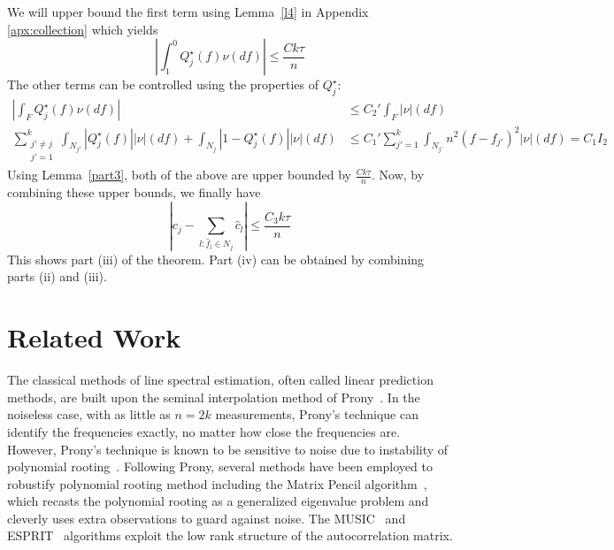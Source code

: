 We will upper bound the first term using Lemma~\ref{l4} in Appendix \ref{apx:collection} which yields
\[
\left| \int^0_{1}  Q_j^\star (f) \nu(df)\right| \leq \frac{Ck \tau}{n}
\]
The other terms can be controlled using the properties of $Q_j^\star$:
\begin{align*}
\left| \int_{F}  Q_j^\star (f) \nu(df)\right| & \leq C_2' \int_{F} |\nu| (df)\\
\sum_{\substack{j' \neq j\\j'=1}}^k \int_{N_{j'}} \left| Q_j^\star (f)\right| |\nu|(df) +  \int_{N_j}  \left|1-Q_j^\star (f)\right| |\nu|(df)
& \leq
 C_1'\sum_{j'=1}^k \int_{N_{j'}} n^2 (f-f_{j'})^2 |\nu|(df) = C_1 I_2
\end{align*}
Using Lemma~\ref{part3}, both of the above are upper bounded by $\frac{C k \tau}{n}$. Now, by combining these upper bounds, we finally have
\[
\left| c_j - \sum_{l : \hat{f}_l \in N_j} \hat{c}_l \right| \leq \frac{C_3 k \tau}{n}
\]
This shows part (iii) of the theorem. Part (iv) can be obtained by combining parts (ii) and (iii).


\section{Related Work}
\label{sec:prony-method}



The classical methods of line spectral estimation, often called linear
prediction methods, are built upon the seminal interpolation method of
Prony~\cite{prony1795}. In the noiseless case, with as little as $n=2k$
measurements, Prony's technique can identify the frequencies exactly, no matter
how close the frequencies are. However, Prony's technique is known to be
sensitive to noise due to instability of polynomial rooting~\cite{kahn92}.
Following Prony, several methods have been employed to robustify polynomial
rooting method including the Matrix Pencil algorithm~\cite{hua02}, which
recasts the polynomial rooting as a generalized eigenvalue problem and cleverly
uses extra observations to guard against noise. The MUSIC~\cite{music} and
ESPRIT~\cite{esprit} algorithms exploit the low rank structure of the
autocorrelation matrix.


